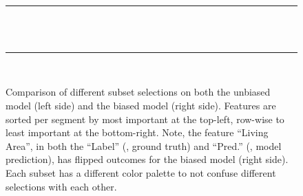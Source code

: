 \begin{figure}[t]
{{}
}
~\\
\noindent\rule{\linewidth}{0.4pt}
~\\
~\\
\noindent\rule{\linewidth}{0.4pt}
~\\
\caption[Comparison of different subset selections on both models.]{
Comparison of different subset selections on both the unbiased model (left side) and the biased model (right side).
Features are sorted per segment by most important at the top-left, row-wise to least important at the bottom-right.
Note, the feature ``Living Area'', in both the ``Label'' (\ie, ground truth) and ``Pred.'' (\ie, model prediction), has flipped outcomes for the biased model (right side).
Each subset has a different color palette to not confuse different selections with each other.
}
\label{figs:good_vs_bad}
\end{figure}


